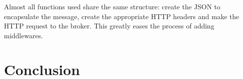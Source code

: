 \documentclass[conference]{IEEEtran}
\begin{document}
Almost all functions used share the same structure: create the JSON to encapsulate the message, create the appropriate HTTP headers and make the HTTP request to the broker. This greatly eases the process of adding middlewares.




\section{Conclusion}





%
%
%





\end{document}

